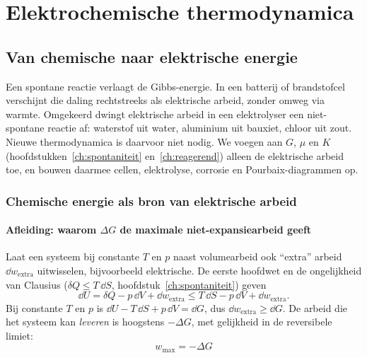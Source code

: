 \chapter{Elektrochemische thermodynamica}
\label{ch:elektrochemie}

\section{Van chemische naar elektrische energie}

Een spontane reactie verlaagt de Gibbs-energie. In een batterij of brandstofcel verschijnt die daling rechtstreeks als elektrische arbeid, zonder omweg via warmte. Omgekeerd dwingt elektrische arbeid in een elektrolyser een niet-spontane reactie af: waterstof uit water, aluminium uit bauxiet, chloor uit zout. Nieuwe thermodynamica is daarvoor niet nodig. We voegen aan $G$, $\mu$ en $K$ (hoofdstukken~\ref{ch:spontaniteit} en~\ref{ch:reagerend}) alleen de elektrische arbeid toe, en bouwen daarmee cellen, elektrolyse, corrosie en Pourbaix-diagrammen op.

\subsection{Chemische energie als bron van elektrische arbeid}
\label{sec:chemische-elektrische-arbeid}

\subsubsection{Afleiding: waarom $\Delta G$ de maximale niet-expansiearbeid geeft}
\label{sec:afleiding-wmax}

Laat een systeem bij constante $T$ en $p$ naast volumearbeid ook ``extra'' arbeid $\dd{w}_{\text{extra}}$ uitwisselen, bijvoorbeeld elektrische. De eerste hoofdwet en de ongelijkheid van Clausius ($\delta Q \leq T\,\dd{S}$, hoofdstuk~\ref{ch:spontaniteit}) geven
\[
\dd{U} = \delta Q - p\,\dd{V} + \dd{w}_{\text{extra}} \leq T\,\dd{S} - p\,\dd{V} + \dd{w}_{\text{extra}}.
\]
Bij constante $T$ en $p$ is $\dd{U} - T\,\dd{S} + p\,\dd{V} = \dd{G}$, dus $\dd{w}_{\text{extra}} \geq \dd{G}$. De arbeid die het systeem kan \emph{leveren} is hoogstens $-\Delta G$, met gelijkheid in de reversibele limiet:
\begin{equation}
\boxed{\;w_{\max} = -\Delta G\;}
\label{eq:wmax}
\end{equation}

